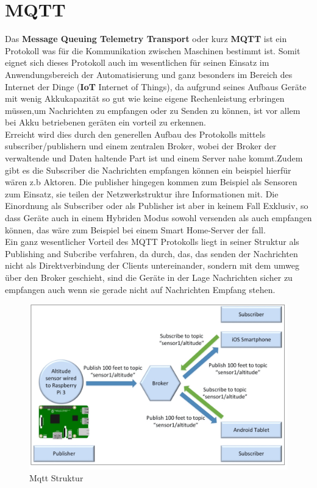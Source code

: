 \section{MQTT}
Das \textbf{Message Queuing Telemetry Transport} oder kurz \textbf{MQTT} ist ein Protokoll was für die Kommunikation zwischen Maschinen bestimmt ist. Somit eignet sich dieses Protokoll auch im wesentlichen für seinen Einsatz im Anwendungsbereich der Automatisierung und ganz besonders im Bereich des Internet der Dinge (\textbf{IoT} Internet of Things), da aufgrund seines Aufbaus Geräte mit wenig Akkukapazität so gut wie keine eigene Rechenleistung erbringen müssen,um Nachrichten zu empfangen oder zu Senden zu können, ist vor allem bei Akku betriebenen geräten ein vorteil zu erkennen.\\
Erreicht wird dies durch den generellen Aufbau des Protokolls mittels subscriber/publishern und einem zentralen Broker, wobei der Broker der verwaltende und Daten haltende Part ist und einem Server nahe kommt.Zudem gibt es die Subscriber die Nachrichten empfangen können ein beispiel hierfür wären z.b Aktoren. Die publisher hingegen kommen zum Beispiel als Sensoren zum Einsatz, sie teilen der Netzwerkstruktur ihre Informationen mit. Die Einordnung als Subscriber oder als Publisher ist aber in keinem Fall Exklusiv, so dass Geräte auch in einem Hybriden Modus sowohl versenden als auch empfangen können, das wäre zum Beispiel bei einem Smart Home-Server der fall.\\
 Ein ganz wesentlicher Vorteil des MQTT Protokolls liegt in seiner Struktur als Publishing and Subcribe verfahren, da durch, das, das senden der Nachrichten nicht als Direktverbindung der Clients untereinander, sondern mit dem umweg über den Broker geschieht, sind die Geräte in der Lage Nachrichten sicher zu empfangen auch wenn sie gerade nicht auf Nachrichten Empfang stehen.\cite{b1}
 \begin{figure}[h]
 \caption{Mqtt Struktur \cite{b1}}
 \centering
 \includegraphics[scale=0.4]{mqtt_structure}
 \end{figure}
